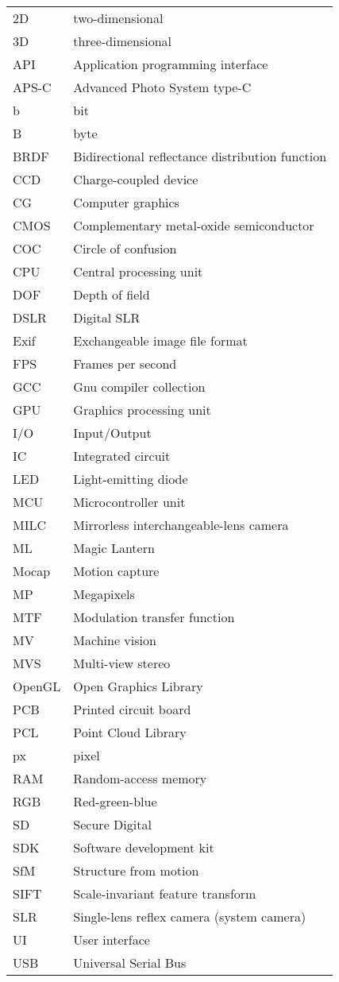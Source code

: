 \begin{tabular}{ll}
	2D & two-dimensional\\
	3D & three-dimensional\\
	API & Application programming interface\\
	APS-C & Advanced Photo System type-C\\
	b & bit\\
	B & byte\\
	BRDF & Bidirectional reflectance distribution function\\
	CCD & Charge-coupled device\\
	CG & Computer graphics\\
	CMOS & Complementary metal-oxide semiconductor\\
	COC & Circle of confusion\\
	CPU & Central processing unit\\
	DOF & Depth of field\\
	DSLR & Digital SLR\\
	Exif & Exchangeable image file format\\
	FPS & Frames per second\\
	GCC & Gnu compiler collection\\
	GPU & Graphics processing unit\\
	I/O & Input/Output\\
	IC & Integrated circuit\\
	LED & Light-emitting diode\\
	MCU & Microcontroller unit\\
	MILC & Mirrorless interchangeable-lens camera\\
	ML & Magic Lantern\\
	Mocap & Motion capture\\
	MP & Megapixels\\
	MTF & Modulation transfer function\\
	MV & Machine vision\\
	MVS & Multi-view stereo\\
	OpenGL & Open Graphics Library\\
	PCB & Printed circuit board\\
	PCL & Point Cloud Library\\
	px & pixel\\
	RAM & Random-access memory\\
	RGB & Red-green-blue\\
	SD & Secure Digital\\
	SDK & Software development kit\\
	SfM & Structure from motion\\
	SIFT & Scale-invariant feature transform\\
	SLR & Single-lens reflex camera (system camera)\\
	UI & User interface\\
	USB & Universal Serial Bus\\
\end{tabular}
